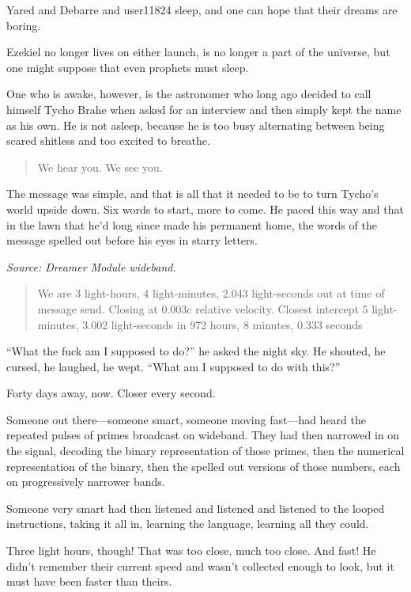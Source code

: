 Yared and Debarre and user11824 sleep, and one can hope that their dreams are boring.

Ezekiel no longer lives on either launch, is no longer a part of the universe, but one might suppose that even prophets must sleep.

One who is awake, however, is the astronomer who long ago decided to call himself Tycho Brahe when asked for an interview and then simply kept the name as his own. He is not asleep, because he is too busy alternating between being scared shitless and too excited to breathe.

\begin{quote}
We hear you. We see you.
\end{quote}

\noindent The message was simple, and that is all that it needed to be to turn Tycho's world upside down. Six words to start, more to come. He paced this way and that in the lawn that he'd long since made his permanent home, the words of the message spelled out before his eyes in starry letters.

\emph{Source: Dreamer Module wideband.}

\begin{quote}
We are 3 light-hours, 4 light-minutes, 2.043 light-seconds out at time of message send. Closing at 0.003c relative velocity. Closest intercept 5 light-minutes, 3.002 light-seconds in 972 hours, 8 minutes, 0.333 seconds
\end{quote}

\noindent ``What the fuck am I supposed to do?'' he asked the night sky. He shouted, he cursed, he laughed, he wept. ``What am I supposed to do with this?''

Forty days away, now. Closer every second.

Someone out there---someone smart, someone moving fast---had heard the repeated pulses of primes broadcast on wideband. They had then narrowed in on the signal, decoding the binary representation of those primes, then the numerical representation of the binary, then the spelled out versions of those numbers, each on progressively narrower bands.

Someone very smart had then listened and listened and listened to the looped instructions, taking it all in, learning the language, learning all they could.

Three light hours, though! That was too close, much too close. And fast! He didn't remember their current speed and wasn't collected enough to look, but it must have been faster than theirs.

